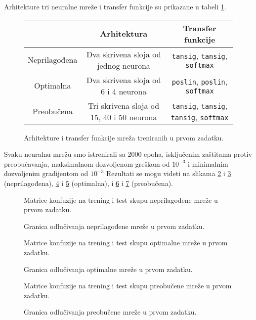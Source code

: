\documentclass[10pt,a4paper,titlepage,croatian]{article}
\begin{document}
Arhitekture tri neuralne mreže i transfer funkcije su prikazane u tabeli \ref{Arhitektura1}.
\begin{figure}
    \begin{tabular}{ |c|c|c| }
        \hline
        & Arhitektura & Transfer funkcije \\
        \hline
        Neprilagođena & Dva skrivena sloja od jednog neurona & \texttt{tansig}, \texttt{tansig}, \texttt{softmax} \\
        \hline
        Optimalna     & Dva skrivena sloja od 6 i 4 neurona  & \texttt{poslin}, \texttt{poslin}, \texttt{softmax} \\
        \hline
        Preobučena    & Tri skrivena sloja od 15, 40 i 50 neurona & \texttt{tansig}, \texttt{tansig}, \texttt{tansig}, \texttt{softmax} \\
        \hline
    \end{tabular}
    \caption{Arhitekture i transfer funkcije mreža treniranih u prvom zadatku.}
    \label{Arhitektura1}
\end{figure}
Svaku neuralnu mrežu smo istrenirali sa 2000 epoha, isključenim zaštitama protiv preobučavanja, maksimalnom dozvoljenom greškom od $10^{-3}$ i minimalnim dozvoljenim gradijentom od $10^{-3}$ Rezultati se mogu videti na slikama \ref{CM1Underfit} i \ref{GO1Underfit} (neprilagođena), \ref{CM1Optimal} i \ref{GO1Optimal} (optimalna), i \ref{CM1Overfit} i \ref{GO1Overfit} (preobučena).
\begin{figure}
    \centering
    
    
    \caption{Matrice konfuzije na trening i test skupu neprilagođene mreže u prvom zadatku.}
    \label{CM1Underfit}
\end{figure}
\begin{figure}
    \centering
    
    \caption{Granica odlučivanja neprilagođene mreže u prvom zadatku.}
    \label{GO1Underfit}
\end{figure}
\begin{figure}
    \centering
    
    
    \caption{Matrice konfuzije na trening i test skupu optimalne mreže u prvom zadatku.}
    \label{CM1Optimal}
\end{figure}
\begin{figure}
    \centering
    
    \caption{Granica odlučivanja optimalne mreže u prvom zadatku.}
    \label{GO1Optimal}
\end{figure}
\begin{figure}
    \centering
    
    
    \caption{Matrice konfuzije na trening i test skupu preobučene mreže u prvom zadatku.}
    \label{CM1Overfit}
\end{figure}
\begin{figure}
    \centering
    
    \caption{Granica odlučivanja preobučene mreže u prvom zadatku.}
    \label{GO1Overfit}
\end{figure}
\end{document}

